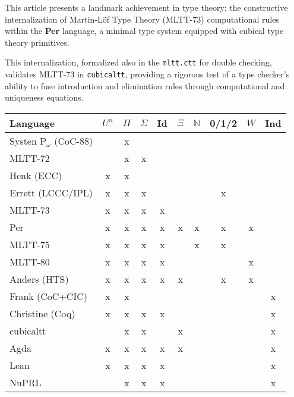 \documentclass{article}
\begin{document}
This article presents a landmark achievement in type theory:
the constructive internalization of Martin-Löf Type Theory (MLTT-73) computational rules
within the \textbf{Per} language, a minimal type system equipped with
cubical type theory primitives.

This internalization, formalized also in the \texttt{mltt.ctt} for double checking,
validates MLTT-73 in \texttt{cubicaltt}, providing a rigorous test
of a type checker's ability to fuse introduction and elimination
rules through computational and uniqueness equations.

\begin{table}[!ht]
  \begin{tabular}{lccccccccc}
    \hline
       Language    & $U^n$ & $\Pi$ & $\Sigma$ & Id & $\Xi$ & $\mathbb{N}$ & 0/1/2 & $W$ & Ind  \\
    \hline
Systen P$_\omega$ (CoC-88)  &   & x &   &   &   &   &   &   &   \\
       MLTT-72              &   & x & x &   &   &   &   &   &   \\
       Henk (ECC)           & x & x &   &   &   &   &   &   &   \\
       Errett (LCCC/IPL)    & x & x & x &   &   &   & x &   &   \\
       MLTT-73              & x & x & x & x &   &   &   &   &   \\
       Per                  & x & x & x & x & x & x & x & x &   \\
       MLTT-75              & x & x & x & x &   & x & x &   &   \\
       MLTT-80              & x & x & x & x &   &   &   & x &   \\
       Anders (HTS)         & x & x & x & x & x &   & x & x &   \\
       Frank (CoC+CIC)      & x & x &   &   &   &   &   &   & x \\
       Christine (Coq)      & x & x & x & x &   &   &   &   & x \\
    \hline
       cubicaltt            &   & x & x &   & x &   &   &   & x \\
       Agda                 & x & x & x & x & x &   &   &   & x \\
       Lean                 & x & x & x & x &   &   &   &   & x \\
       NuPRL                &   & x & x & x &   &   &   &   & x \\
    \hline
  \end{tabular}
\end{table}
\end{document}
